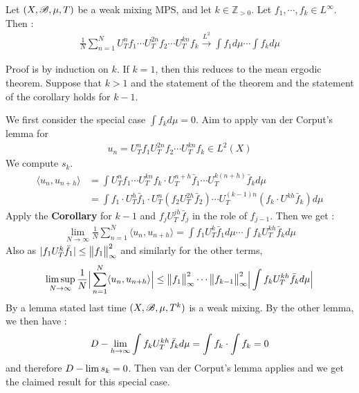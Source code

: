 \documentclass[12pt,a4paper]{report}
\newenvironment{proof}
{\begin{changemargin}{1cm}{0.5cm} 
	}%
	{\end{changemargin}
}
\begin{document}
\thm Let $(X,\mathscr{B}, \mu, T)$ be a weak mixing MPS, and let $k\in \mathbb{Z}_{>0}$. Let $f_1,\cdots,f_k \in L^{\infty}$. Then :
\begin{align*}
\frac{1}{N} \sum_{n=1}^N U^n_T f_1 \cdots U^{2n}_T f_2 \cdots U^{kn}_T f_k \xrightarrow{L^2} \int f_1 d\mu \cdots \int f_{k} d\mu
\end{align*}
\begin{proof}
\pf Proof is by induction on $k$. If $k=1$, then this reduces to the mean ergodic theorem. Suppose that $k>1$ and the statement of the theorem and the statement of the corollary holds for $k-1$.

\quad We first consider the special case $\int f_{k} d\mu =0$. Aim to apply van der Corput's lemma for
\begin{align*}
u_n = U^n_T f_1 U^{2n}_T f_2 \cdots U^{kn}_T f_k \in L^2(X)
\end{align*}
We compute $s_k$.
\begin{align*}
\langle u_n, u_{n+h} \rangle &= \int U^n_T f_1 \cdots U^{kn}_T f_k \cdot U^{n+h}_T \bar{f}_1 \cdots U^{k(n+h)}_T \bar{f}_k d\mu \\
&= \int f_1 \cdot U^h_T \bar{f}_1 \cdot U^n_T (f_2 U^{2h}_T \bar{f}_2) \cdots U^{(k-1)n}_T (f_k \cdot U^{kh} \bar{f}_k) d\mu
\end{align*}
Apply the \textbf{Corollary} for $k-1$ and $f_j U_T^{jh} \bar{f}_j$ in the role of $f_{j-1}$. Then we get :
\begin{align*}
\lim_{N\rightarrow \infty} \frac{1}{N} \sum_{n=1}^N \langle u_n, u_{n+h} \rangle = \int f_1 U^k_T \bar{f}_1 d\mu \cdots \int f_k U^{kh}_T \bar{f}_k d\mu
\end{align*}
Also as $|f_1 U^k_T \bar{f}_1| \leq \bigl\lVert f_1\bigr\rVert_{\infty}^2$ and similarly for the other terms,
\begin{align*}
\limsup_{N\rightarrow \infty} \frac{1}{N} \Big| \sum_{n=1}^N \langle u_n, u_{n+h} \rangle \Big| \leq \bigl\lVert f_1\bigr\rVert_{\infty}^2  \cdots \bigl\lVert f_{k-1}\bigr\rVert_{\infty}^2 \Big| \int f_k U^{kh}_T \bar{f}_{k} d\mu \Big|
\end{align*}
By a lemma stated last time $(X,\mathscr{B}, \mu, T^k)$ is a weak mixing. By the other lemma, we then have :
\begin{align*}
D-\lim_{h\rightarrow \infty} \int f_k U^{kh}_T \bar{f}_k d\mu = \int f_k \cdot \int f_k = 0
\end{align*}
and therefore $D-\lim s_k =0$. Then van der Corput's lemma applies and we get the claimed result for this special case.
\s


\end{proof}
\end{document}
